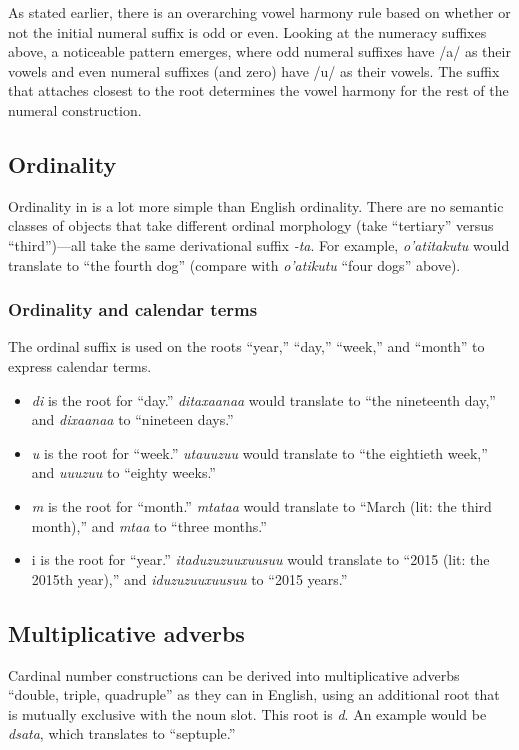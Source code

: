 			As stated earlier, there is an overarching vowel harmony rule based on whether or not the initial numeral suffix is odd or even. Looking at the numeracy suffixes above, a noticeable pattern emerges, where odd numeral suffixes have /a/ as their vowels and even numeral suffixes (and zero) have /u/ as their vowels. The suffix that attaches closest to the root \emph{\R\OO} determines the vowel harmony for the rest of the numeral construction.

	\subsection{Ordinality}
		Ordinality in {\kurango} is a lot more simple than English ordinality. There are no semantic classes of objects that take different ordinal morphology (take ``tertiary'' versus ``third'')---all take the same derivational suffix \emph{-ta}. For example, \emph{o'atitakutu} would translate to ``the fourth dog'' (compare with \emph{o'atikutu} ``four dogs'' above).

		\subsubsection{Ordinality and calendar terms}
			The ordinal suffix is used on the roots ``year,'' ``day,'' ``week,'' and ``month'' to express calendar terms.

			\begin{itemize}
			\item \emph{di} is the root for ``day.'' \emph{ditaxa\R ana\B a} would translate to ``the nineteenth day,'' and \emph{dixa\R ana\B a} to ``nineteen days.''

			\item \emph{\glot u} is the root for ``week.'' \emph{\glot uta\glot u\glot uzu\R u} would translate to ``the eightieth week,'' and \emph{\glot u\glot u\glot uzu\R u} to ``eighty weeks.''

			\item \emph{m\OO} is the root for ``month.'' \emph{m\OO tata\R a} would translate to ``March (lit: the third month),'' and \emph{m\OO ta\R a} to ``three months.''

			\item \M i is the root for ``year.'' \emph{\M itaduzuzu\R uxu\R usu\N u} would translate to ``2015 (lit: the 2015th year),'' and \emph{\M iduzuzu\R uxu\R usu\N u} to ``2015 years.''
			\end{itemize}

	\subsection{Multiplicative adverbs}
		Cardinal number constructions can be derived into multiplicative adverbs ``double, triple, quadruple'' as they can in English, using an additional root that is mutually exclusive with the noun slot. This root is \emph{d\OO\R\OO}. An example would be \emph{d\OO\R\OO sata}, which translates to ``septuple.''

